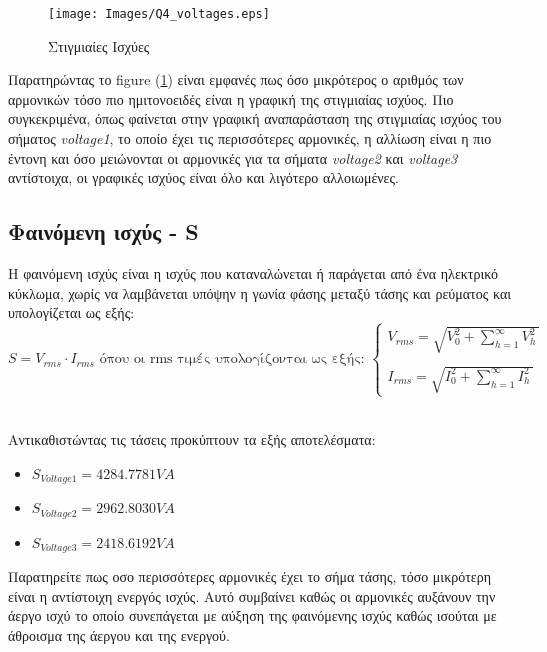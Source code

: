 \begin{figure}[h]
    \centering
    \texttt{[image: Images/Q4\_voltages.eps]}
    \caption{Στιγμιαίες Ισχύες}
    \label{instantaneous}
\end{figure}

\noindent
Παρατηρώντας το figure (\ref{instantaneous}) είναι εμφανές πως όσο μικρότερος ο αριθμός των αρμονικών τόσο πιο ημιτονοειδές είναι η γραφική της στιγμιαίας ισχύος. Πιο συγκεκριμένα, όπως φαίνεται στην γραφική αναπαράσταση της στιγμιαίας ισχύος του σήματος \textit{voltage1}, το οποίο έχει τις περισσότερες αρμονικές, η αλλίωση είναι η πιο έντονη και όσο μειώνονται οι αρμονικές για τα σήματα \textit{voltage2} και \textit{voltage3} αντίστοιχα, οι γραφικές ισχύος είναι όλο και λιγότερο αλλοιωμένες.

\subsection*{Φαινόμενη ισχύς - S}
\label{ex4q4}
Η φαινόμενη ισχύς είναι η ισχύς που καταναλώνεται ή παράγεται από ένα ηλεκτρικό κύκλωμα, χωρίς να λαμβάνεται υπόψην η γωνία φάσης μεταξύ τάσης και ρεύματος και υπολογίζεται ως εξής:
\begin{equation}
    S = V_{rms} \cdot I_{rms} \text{ όπου oι rms τιμές υπολογίζονται ως εξής: } \left\{ \begin{array}{l}
                                                                                            V_{rms}=\sqrt{V_0^2+\sum_{h=1}^{\infty }V_h^2\:}\\
                                                                                            \\
                                                                                            I_{rms}=\sqrt{I_0^2+\sum_{h=1}^{\infty }I_h^2\:}
                                                                                        \end{array}
                                                                                \right. 
\quad                                                                              
\end{equation} 

\noindent\\
Αντικαθιστώντας τις τάσεις προκύπτουν τα εξής αποτελέσματα:
\begin{itemize}
    \item $S_{Voltage1} = 4284.7781VA$
    \item $S_{Voltage2} = 2962.8030VA$
    \item $S_{Voltage3} = 2418.6192VA$
\end{itemize}
\noindent
Παρατηρείτε πως οσο περισσότερες αρμονικές έχει το σήμα τάσης, τόσο μικρότερη είναι η αντίστοιχη ενεργός ισχύς. Αυτό συμβαίνει καθώς οι αρμονικές αυξάνουν την άεργο ισχύ το οποίο συνεπάγεται με αύξηση της φαινόμενης ισχύς καθώς ισούται με άθροισμα της άεργου και της ενεργού.


